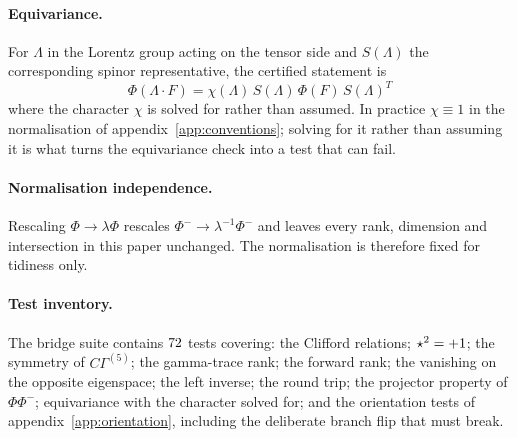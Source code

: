 \paragraph{Equivariance.}
For $\Lambda$ in the Lorentz group acting on the tensor side and $S(\Lambda)$ the
corresponding spinor representative, the certified statement is
\begin{equation}
\Phi(\Lambda \cdot F) = \chi(\Lambda)\,
 S(\Lambda)\,\Phi(F)\,S(\Lambda)^{T}
\end{equation}
where the character $\chi$ is solved for rather than assumed. In practice
$\chi \equiv 1$ in the normalisation of appendix~\ref{app:conventions}; solving
for it rather than assuming it is what turns the equivariance check into a test
that can fail.

\paragraph{Normalisation independence.}
Rescaling $\Phi \to \lambda\Phi$ rescales $\Phi^- \to \lambda^{-1}\Phi^-$ and
leaves every rank, dimension and intersection in this paper unchanged. The
normalisation is therefore fixed for tidiness only.

\paragraph{Test inventory.}
The bridge suite contains $72$ tests covering: the Clifford relations;
$\star^2 = +1$; the symmetry of $C\Gamma^{(5)}$; the gamma-trace rank;
the forward rank; the vanishing on the opposite eigenspace; the left inverse; the
round trip; the projector property of $\Phi\Phi^-$; equivariance with the
character solved for; and the orientation tests of
appendix~\ref{app:orientation}, including the deliberate branch flip that must
break.
